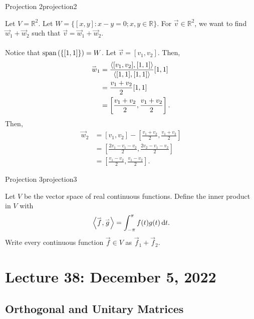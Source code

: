         \pagebreak
        \begin{example}{Projection 2}{projection2}

            Let \(V=\mathbb{R}^2\). Let \(W=\{[x,y]:x-y=0;x,y\in\mathbb{R}\}\). For \(\vec{v}\in\mathbb{R}^2\), we want to find \(\vec{w}_1+\vec{w}_2\) such that \(\vec{v}=\vec{w}_1+\vec{w}_2\).
            \\
            \\
            Notice that \(\text{span\,}(\{[1,1]\})=W\). Let \(\vec{v}=[v_1,v_2]\). Then,
            \begin{align*}
                \overset{_{\rightharpoonup}}{w}_1&=\frac{\left\langle [v_1,v_2],[1,1]\right\rangle}{\left\langle [1,1],[1,1]\right\rangle}[1,1] \\
                &=\frac{v_1+v_2}{2}[1,1] \\
                &=\left[\frac{v_1+v_2}{2},\frac{v_1+v_2}{2}\right].
            \end{align*}
            Then,
            \begin{align*}
                \vec{w}_2&=[v_1,v_2]-\left[\frac{v_1+v_2}{2},\frac{v_1+v_2}{2}\right] \\
                &=\left[\frac{2v_1-v_1-v_2}{2},\frac{2v_2-v_1-v_2}{2}\right] \\
                &=\left[\frac{v_1-v_2}{2},\frac{v_1-v_2}{2}\right].
            \end{align*}
            
        \end{example}
        \begin{example}{Projection 3}{projection3}

            Let \(V\) be the vector space of real continuous functions. Define the inner product in \(V\) with
            \begin{equation*}
                \left\langle \overset{_{\rightharpoonup}}{f},\overset{_{\rightharpoonup}}{g}\right\rangle=\int_{-\pi}^\pi f(t)g(t) \,\text{d} t.
            \end{equation*}
            Write every continuous function \(\vec{f}\in V\) as \(\vec{f}_1+\vec{f}_2\).
            
        \end{example}

\pagebreak

\section{Lecture 38: December 5, 2022}

    \subsection{Orthogonal and Unitary Matrices}

